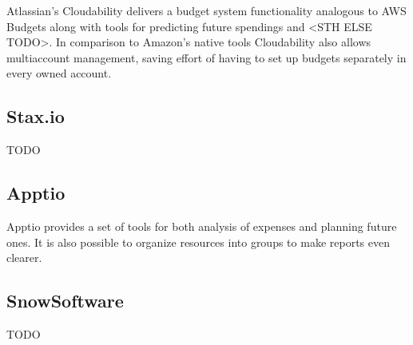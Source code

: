 \documentclass[licencjacka,en]{thesisclass}
\begin{document}
	Atlassian's Cloudability delivers a budget system functionality analogous to AWS Budgets
	along with tools for predicting future spendings and <STH ELSE TODO>. In comparison to Amazon's
	native tools Cloudability also allows multiaccount management, saving effort of having to set up budgets separately in every owned account.

	\subsection{Stax.io}

	TODO

	\subsection{Apptio}

	Apptio provides a set of tools for both analysis of expenses and planning future ones. It
	is also possible to organize resources into groups to make reports even clearer.

	\subsection{SnowSoftware}

	TODO

\end{document}

